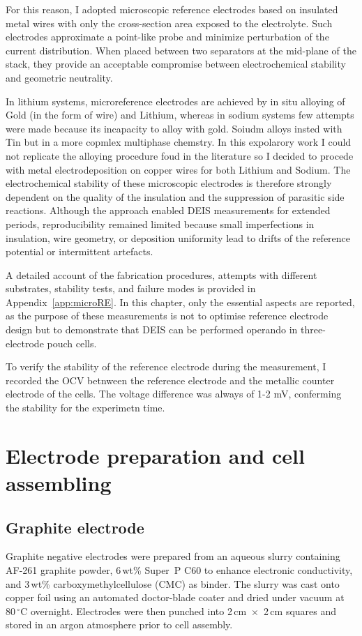 For this reason, I adopted microscopic reference electrodes based on insulated metal wires with only the cross-section area exposed to the electrolyte.  
Such electrodes approximate a point-like probe and minimize perturbation of the current distribution.  
When placed between two separators at the mid-plane of the stack, they provide an acceptable compromise between electrochemical stability and geometric neutrality.

In lithium systems, microreference electrodes are achieved by in situ alloying of Gold (in the form of wire) and Lithium, whereas in sodium systems few attempts were made because its incapacity to alloy with gold. 
Soiudm alloys insted with Tin but in a more copmlex multiphase chemstry.
In this expolarory work I could not replicate the alloying procedure foud in the literature so I decided to procede with metal electrodeposition on copper wires for both Lithium and Sodium. 
The electrochemical stability of these microscopic electrodes is therefore strongly dependent on the quality of the insulation and the suppression of parasitic side reactions.  
Although the approach enabled DEIS measurements for extended periods, reproducibility remained limited because small imperfections in insulation, wire geometry, or deposition uniformity lead to drifts of the reference potential or intermittent artefacts.

A detailed account of the fabrication procedures, attempts with different substrates, stability tests, and failure modes is provided in Appendix~\ref{app:microRE}.  
In this chapter, only the essential aspects are reported, as the purpose of these measurements is not to optimise reference electrode design but to demonstrate that DEIS can be performed operando in three-electrode pouch cells.

To verify the stability of the reference electrode during the measurement, I recorded the OCV betnween the reference electrode and the metallic counter electrode of the cells.
The voltage difference was always of 1-2 mV, conferming the stability for the experimetn time.

\section{Electrode preparation and cell assembling}

\subsection{Graphite electrode}
Graphite negative electrodes were prepared from an aqueous slurry containing AF-261 graphite powder, 6\,wt\% Super~P C60 to enhance electronic conductivity, and 3\,wt\% carboxymethylcellulose (CMC) as binder.  
The slurry was cast onto copper foil using an automated doctor-blade coater and dried under vacuum at 80\,$^\circ$C overnight.  
Electrodes were then punched into 2\,cm~$\times$~2\,cm squares and stored in an argon atmosphere prior to cell assembly.

